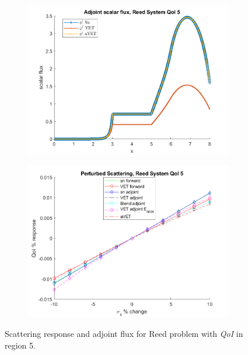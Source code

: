 \documentclass[12pt]{report}
\newcommand{\qoi}{{\it QoI}\xspace}
\begin{document}
\begin{figure}[H]
\centering
\begin{subfigure}{.5\textwidth}
  \centering
  \includegraphics[width=.98\linewidth]{figures2/774phia.png}
\end{subfigure}%
\begin{subfigure}{.5\textwidth}
  \centering
  \includegraphics[width=.98\linewidth]{figures2/774sigsSens.png}
\end{subfigure}
\caption{Scattering response and adjoint flux for Reed problem with \qoi in region 5.}
\label{Reed5}
\end{figure}
\end{document}
